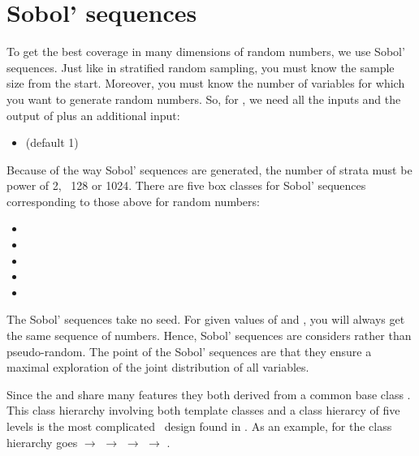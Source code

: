 \section{Sobol' sequences}
To get the best coverage in many dimensions of random numbers, we use Sobol' sequences. Just like in stratified random sampling, you must know the sample size from the start. Moreover, you must know the number of variables for which you want to generate random numbers. So, for , we need all the inputs and the output of  plus an additional input:
\begin{itemize}
\item {} (default 1)
\end{itemize}
Because of the way Sobol' sequences are generated, the number of strata must be power of 2, \eg\ 128 or 1024. There are five box classes for Sobol' sequences corresponding to those above for random numbers:
\begin{itemize}
\item {}
\item {}
\item {}
\item {}
\item {}
\end{itemize}
The Sobol' sequences take no seed. For given values of  and , you will always get the same sequence of numbers. Hence, Sobol' sequences are considers  rather than pseudo-random. The point of the Sobol' sequences are that they ensure a maximal exploration of the joint distribution of all variables.

Since the   and  share many features they both derived from a common base class . This class hierarchy involving both template classes and a class hierarcy of five levels is the most complicated \CPP\ design found in \US. As an example, for  the class hierarchy goes  $\rightarrow$  $\rightarrow$  $\rightarrow$  $\rightarrow$ .

